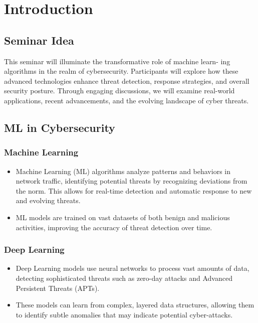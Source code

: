 \documentclass[oneside,a4paper,12pt]{report}
\begin{document}
\newpage
\chapter{Introduction}
\section{Seminar Idea}
This seminar will illuminate the transformative role of machine learn-
ing algorithms in the realm of cybersecurity. Participants will explore
how these advanced technologies enhance threat detection, response
strategies, and overall security posture. Through engaging discussions,
we will examine real-world applications, recent advancements, and the
evolving landscape of cyber threats.

\vspace*{2\baselineskip}

\section{ML in Cybersecurity}
\subsection{Machine Learning}
\begin{itemize}
\item 
Machine Learning (ML) algorithms analyze patterns and behaviors in network traffic, identifying potential threats by recognizing deviations from the norm. This allows for real-time detection and automatic response to new and evolving threats.
\newline \item 
ML models are trained on vast datasets of both benign and malicious activities, improving the accuracy of threat detection over time. 
\end{itemize}

\subsection{Deep Learning}
\begin{itemize}
\item 
Deep Learning models use neural networks to process vast amounts of data, detecting sophisticated threats such as zero-day attacks and Advanced Persistent Threats (APTs).
\newline \item 
These models can learn from complex, layered data structures, allowing them to identify subtle anomalies that may indicate potential cyber-attacks.
\end{itemize}
\end{document}
